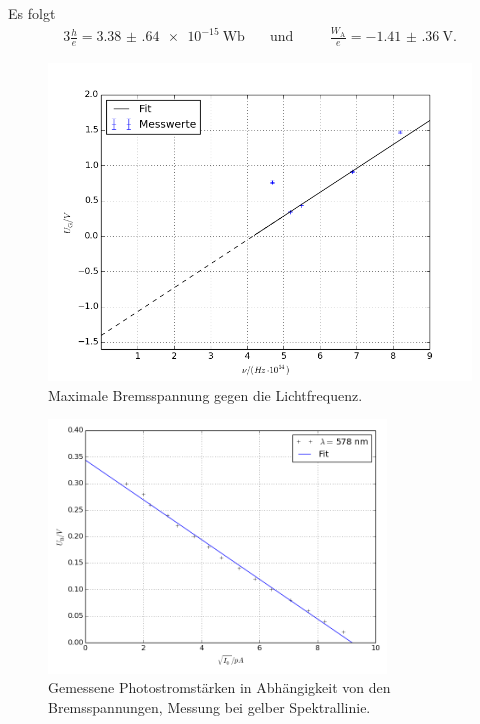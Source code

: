 Es folgt
\begin{alignat}{3}
	\frac{h}{e}=\SI{3.38(64)e-15}{\weber} \quad&\text{und} \quad&&\frac{W_\text{A}}{e}= \SI{-1.41(36)}{\volt}.
\end{alignat}
\begin{figure}[H]
	\centering
	\includegraphics[width=\textwidth]{Bilder/unu_diag.png}
	\caption{Maximale Bremsspannung gegen die Lichtfrequenz.}
	\label{fig:unu}
\end{figure}
\newpage
\begin{figure}[p]
	\centering
	\includegraphics[width=0.8\textwidth]{Bilder/Fit_gelb.png}
	\caption{Gemessene Photostromstärken in Abhängigkeit von den Bremsspannungen, Messung bei gelber Spektrallinie.}
	\label{fig:uidiagramm1}
\end{figure}
